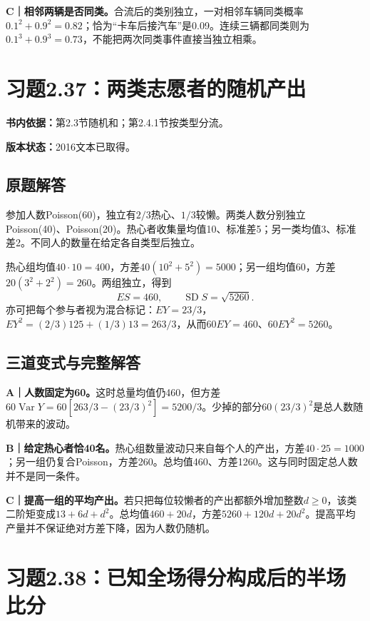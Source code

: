 \documentclass[
  11pt,
  a4paper,
  UTF8,fontset=fandol]{ctexart}
\let\OldSection\section
\renewcommand{\section}{\Needspace{7\baselineskip}\OldSection}
\let\OldSubsection\subsection
\renewcommand{\subsection}{\Needspace{5\baselineskip}\OldSubsection}
\begin{document}
\textbf{C｜相邻两辆是否同类。}合流后的类别独立，一对相邻车辆同类概率\(0.1^2+0.9^2=0.82\)；恰为``卡车后接汽车''是0.09。连续三辆都同类则为\(0.1^3+0.9^3=0.73\)，不能把两次同类事件直接当独立相乘。

\newpage

\section{习题2.37：两类志愿者的随机产出}\label{ux4e60ux98982.37ux4e24ux7c7bux5fd7ux613fux8005ux7684ux968fux673aux4ea7ux51fa}

\textbf{书内依据：}第2.3节随机和；第2.4.1节按类型分流。

\textbf{版本状态：}2016文本已取得。

\subsection{原题解答}\label{ux539fux9898ux89e3ux7b54-36}

参加人数Poisson(60)，独立有\(2/3\)热心、\(1/3\)较懒。两类人数分别独立Poisson(40)、Poisson(20)。热心者收集量均值10、标准差5；另一类均值3、标准差2。不同人的数量在给定各自类型后独立。

热心组均值\(40\cdot10=400\)，方差\(40(10^2+5^2)=5000\)；另一组均值60，方差\(20(3^2+2^2)=260\)。两组独立，得到
\[\boxed{ES=460,\qquad\operatorname{SD}S=\sqrt{5260}.}\]
亦可把每个参与者视为混合标记：\(EY=23/3\)，\(EY^2=(2/3)125+(1/3)13=263/3\)，从而\(60EY=460\)、\(60EY^2=5260\)。

\subsection{三道变式与完整解答}\label{ux4e09ux9053ux53d8ux5f0fux4e0eux5b8cux6574ux89e3ux7b54-36}

\textbf{A｜人数固定为60。}这时总量均值仍460，但方差\(60\operatorname{Var}Y=60[263/3-(23/3)^2]=5200/3\)。少掉的部分\(60(23/3)^2\)是总人数随机带来的波动。

\textbf{B｜给定热心者恰40名。}热心组数量波动只来自每个人的产出，方差\(40\cdot25=1000\)；另一组仍复合Poisson，方差260。总均值460、方差1260。这与同时固定总人数并不是同一条件。

\textbf{C｜提高一组的平均产出。}若只把每位较懒者的产出都额外增加整数\(d\ge0\)，该类二阶矩变成\(13+6d+d^2\)。总均值\(460+20d\)，方差\(5260+120d+20d^2\)。提高平均产量并不保证绝对方差下降，因为人数仍随机。

\newpage

\section{习题2.38：已知全场得分构成后的半场比分}\label{ux4e60ux98982.38ux5df2ux77e5ux5168ux573aux5f97ux5206ux6784ux6210ux540eux7684ux534aux573aux6bd4ux5206}
\end{document}
